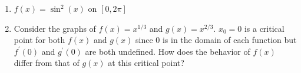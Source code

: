 \documentclass[12pt]{article}
\begin{document}
\begin{enumerate}
\newpage

\item $f(x)=\sin^{2}{(x)}$ on $[0,2\pi]$


\item Consider the graphs of $f(x)=x^{1/3}$ and $g(x)=x^{2/3}$.  $x_0=0$ is a critical point for both $f(x)$ and $g(x)$ since $0$ is in the domain of each function but $f^{\prime}(0)$ and $g^{\prime}(0)$ are both undefined.  How does the behavior of $f(x)$ differ from that of $g(x)$ at this critical point?


\end{enumerate}
\end{document}
